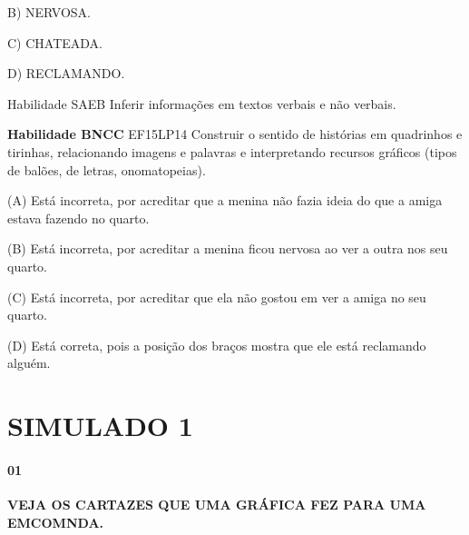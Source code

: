 \begin{escola}
B) NERVOSA.

C) CHATEADA.

D) RECLAMANDO.

Habilidade SAEB Inferir informações em textos verbais e não verbais.

\textbf{Habilidade BNCC} EF15LP14 Construir o sentido de histórias em
quadrinhos e tirinhas, relacionando imagens e palavras e interpretando
recursos gráficos (tipos de balões, de letras, onomatopeias).

(A) Está incorreta, por acreditar que a menina não fazia ideia do que a
amiga estava fazendo no quarto.

(B) Está incorreta, por acreditar a menina ficou nervosa ao ver a outra
nos seu quarto.

(C) Está incorreta, por acreditar que ela não gostou em ver a amiga no
seu quarto.

(D) Está correta, pois a posição dos braços mostra que ele está
reclamando alguém.

\chapter{SIMULADO 1}

\subsubsection{01}\label{section-26}

\textbf{VEJA OS CARTAZES QUE UMA GRÁFICA FEZ PARA UMA EMCOMNDA.}


\end{escola}
